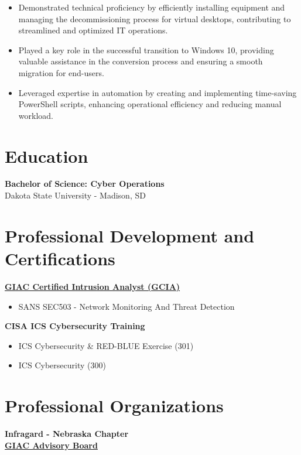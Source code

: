 \documentclass[a4paper,10pt]{article}
\begin{document}
\begin{itemize}
\begin{itemize}
        \item Demonstrated technical proficiency by efficiently installing equipment and managing the decommissioning process for virtual desktops, contributing to streamlined and optimized IT operations.
        \item Played a key role in the successful transition to Windows 10, providing valuable assistance in the conversion process and ensuring a smooth migration for end-users.
        \item Leveraged expertise in automation by creating and implementing time-saving PowerShell scripts, enhancing operational efficiency and reducing manual workload.
    \end{itemize}
\end{itemize}

\section*{Education}
\textbf{Bachelor of Science: Cyber Operations} \\
Dakota State University - Madison, SD 
\section*{Professional Development and Certifications}
\href{https://www.credly.com/badges/87563fff-910c-449c-ab21-f571b162cd4b/public_url}{\textbf{GIAC Certified Intrusion Analyst (GCIA)}}
\begin{itemize}
    \small
    \leftskip=4em
    \item SANS SEC503 - Network Monitoring And Threat Detection
\end{itemize}
\textbf{CISA ICS Cybersecurity Training}
\begin{itemize}
    \small
    \leftskip=4em
    \item ICS Cybersecurity \& RED-BLUE Exercise (301) 
    \item ICS Cybersecurity (300)
\end{itemize}
\section*{Professional Organizations}
\textbf{Infragard - Nebraska Chapter} \\
\href{https://www.credly.com/badges/a65cec63-e07c-4e52-b154-842564aadf65/public_url}{\textbf{GIAC Advisory Board}}
\end{document}
